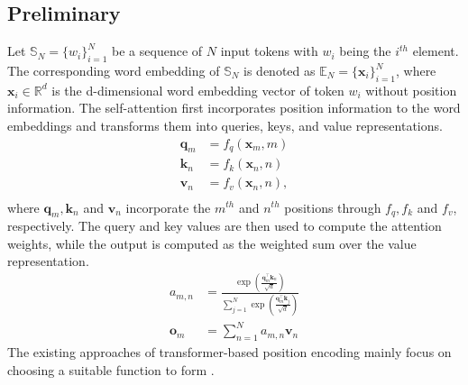 \documentclass{article}
\def\q{{\boldsymbol q}}
\def\k{{\boldsymbol k}}
\def\v{{\boldsymbol v}}
\def\x{{\boldsymbol x}}
\begin{document}
\subsection{Preliminary}
Let $\mathbb{S}_N=\{w_i\}_{i=1}^{N}$ be a sequence of $N$ input tokens with $w_i$ being the $i^{th}$ element. The corresponding word embedding of $\mathbb{S}_N$ is denoted as $\mathbb{E}_N = \{\x_i\}_{i=1}^{N}$, where $\x_i\in \mathbb{R}^{d}$ is the d-dimensional word embedding vector of token $w_i$ without position information. The self-attention first incorporates position information to the word embeddings and transforms them into queries, keys, and value representations. 
\begin{equation}
	\begin{aligned}
		\q_m &=f_q(\x_m, m)\\
		\k_n &=f_k(\x_n, n)\\
		\v_n &=f_v(\x_n, n),\\
	\end{aligned}
	\label{fn:qkv}
\end{equation}
where $\q_m,\k_n$ and $ \v_n$ incorporate the $m^{th}$ and $n^{th}$ positions through $f_q,f_k$ and $f_v$, respectively. The query and key values are then used to compute the attention weights, while  the output is computed as the weighted sum over the value representation. 
\begin{equation}
	\begin{aligned}
		a_{m,n}&=\frac{\exp(\frac{\q_m^{\intercal}\k_n}{\sqrt{d}})}{\sum_{j=1}^{N}\exp(\frac{\q_m^{\intercal}\k_j}{\sqrt{d}})}\\
		\mathbf{o}_m&=\sum_{n=1}^{N}a_{m,n}\v_{n}
	\end{aligned}
	\label{fn:attn}
\end{equation}
The existing approaches of transformer-based position encoding mainly focus on choosing a suitable function to form .
\end{document}
